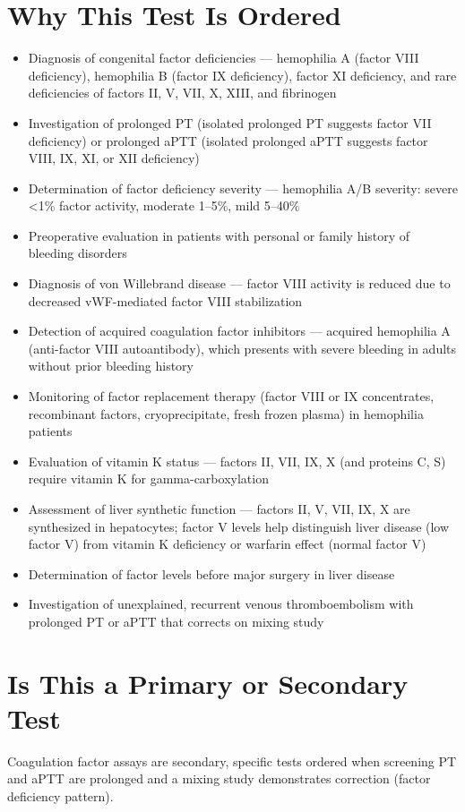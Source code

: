 \section*{Why This Test Is Ordered}
\begin{itemize}
  \item Diagnosis of congenital factor deficiencies --- hemophilia A (factor VIII deficiency), hemophilia B (factor IX deficiency), factor XI deficiency, and rare deficiencies of factors II, V, VII, X, XIII, and fibrinogen
  \item Investigation of prolonged PT (isolated prolonged PT suggests factor VII deficiency) or prolonged aPTT (isolated prolonged aPTT suggests factor VIII, IX, XI, or XII deficiency)
  \item Determination of factor deficiency severity --- hemophilia A/B severity: severe <1\% factor activity, moderate 1--5\%, mild 5--40\%
  \item Preoperative evaluation in patients with personal or family history of bleeding disorders
  \item Diagnosis of von Willebrand disease --- factor VIII activity is reduced due to decreased vWF-mediated factor VIII stabilization
  \item Detection of acquired coagulation factor inhibitors --- acquired hemophilia A (anti-factor VIII autoantibody), which presents with severe bleeding in adults without prior bleeding history
  \item Monitoring of factor replacement therapy (factor VIII or IX concentrates, recombinant factors, cryoprecipitate, fresh frozen plasma) in hemophilia patients
  \item Evaluation of vitamin K status --- factors II, VII, IX, X (and proteins C, S) require vitamin K for gamma-carboxylation
  \item Assessment of liver synthetic function --- factors II, V, VII, IX, X are synthesized in hepatocytes; factor V levels help distinguish liver disease (low factor V) from vitamin K deficiency or warfarin effect (normal factor V)
  \item Determination of factor levels before major surgery in liver disease
  \item Investigation of unexplained, recurrent venous thromboembolism with prolonged PT or aPTT that corrects on mixing study
\end{itemize}

\section*{Is This a Primary or Secondary Test}
Coagulation factor assays are secondary, specific tests ordered when screening PT and aPTT are prolonged and a mixing study demonstrates correction (factor deficiency pattern).

